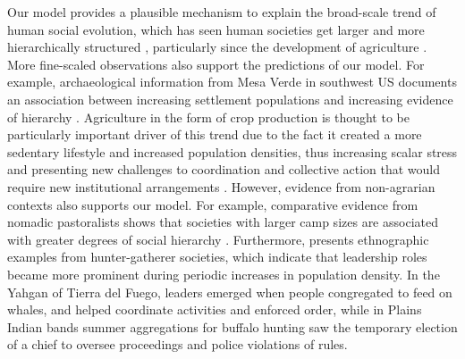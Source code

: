 \documentclass{rstb}
\begin{document}
\begin{linenumbers}
Our model provides a plausible mechanism to explain the broad-scale trend of human social evolution, which has seen human societies get larger and more hierarchically structured \cite{Boehm:1999:a,Price:1995:a,Price:2010:a,Turchin:2018:a}, particularly since the development of agriculture \cite{Bocquet-Appel:2011:a,Currie:2020:a,Turchin:2022:a}. 
More fine-scaled observations also support the predictions of our model. For example, archaeological information from Mesa Verde in southwest US documents an association between increasing settlement populations and increasing evidence of hierarchy \cite{Kohler:2008:a}. Agriculture in the form of crop production is thought to be particularly important driver of this trend due to the fact it created a more sedentary lifestyle and increased population densities, thus increasing scalar stress and presenting new challenges to coordination and collective action that would require new institutional arrangements  \cite{Hunt:1988:a,Trawick:2001:a,Janssen:2012:a,Carballo:2014:a}. However, evidence from non-agrarian contexts also supports our model. For example, comparative evidence from nomadic pastoralists shows that societies with larger camp sizes are associated with greater degrees of social hierarchy \cite{Johnson:1982:a}. Furthermore, \cite{vonReuden:2015:a} presents ethnographic examples from hunter-gatherer societies, which indicate that leadership roles became more prominent during periodic increases in population density. In the Yahgan of Tierra del Fuego, leaders emerged when people congregated to feed on whales, and helped coordinate activities and enforced order, while in Plains Indian bands summer aggregations for buffalo hunting saw the temporary election of a chief to oversee proceedings and police violations of rules. 


\end{linenumbers}
\end{document}
